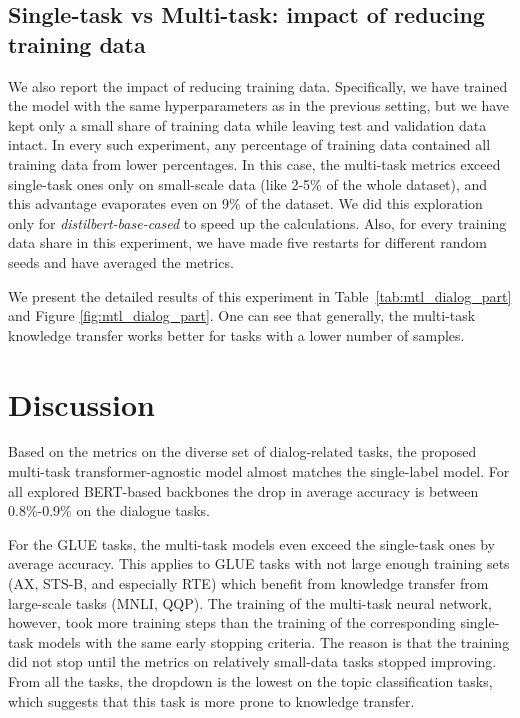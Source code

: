 \subsection{Single-task vs Multi-task: impact of reducing training data}
We also report the impact of reducing training data. Specifically, we have trained the model with the same hyperparameters as in the previous setting, but we have kept only a small share of training data while leaving test and validation data intact. In every such experiment, any percentage of training data contained all training data from lower percentages.%
In this case, the multi-task metrics exceed single-task ones only on small-scale data (like 2-5\% of the whole dataset), and this advantage evaporates even on 9\% of the dataset. 
We did this exploration only for \textit{distilbert-base-cased} to speed up the calculations. Also, for every training data share in this experiment, we have made five restarts for different random seeds and have averaged the metrics. 

We present the detailed results of this experiment in Table~\ref{tab:mtl_dialog_part} and Figure \ref{fig:mtl_dialog_part}. One can see that generally, the multi-task knowledge transfer works better for tasks with a lower number of samples.



\section{Discussion} 

Based on the metrics on the diverse set of dialog-related tasks, the proposed multi-task transformer-agnostic model almost matches the single-label model. 
For all explored BERT-based backbones the drop in average accuracy is between 0.8\%-0.9\% on the dialogue tasks.

For the GLUE tasks, the multi-task models even exceed the single-task ones by average accuracy. This applies to GLUE tasks with not large enough training sets (AX, STS-B, and especially RTE) which benefit from knowledge transfer from large-scale tasks (MNLI, QQP).
The training of the multi-task neural network, however, took more training steps than the training of the corresponding single-task models with the same early stopping criteria. The reason is that the training did not stop until the metrics on relatively small-data tasks stopped improving. 
From all the tasks, the dropdown is the lowest on the topic classification tasks, which suggests that this task is more prone to knowledge transfer.

